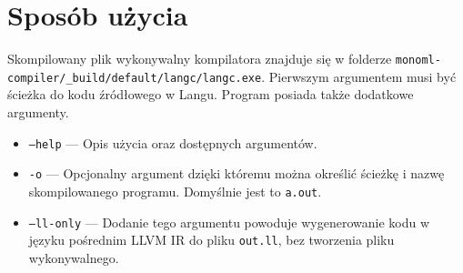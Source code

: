 \documentclass[declaration,shortabstract]{iithesis}
\begin{document}











\section{Sposób użycia}
Skompilowany plik wykonywalny kompilatora znajduje się w folderze \newline
\texttt{monoml-compiler/\_build/default/langc/langc.exe}. Pierwszym argumentem 
musi być ścieżka do kodu źródłowego w Langu. Program posiada także dodatkowe 
argumenty. 

\begin{itemize}
  \item \texttt{--help} --- Opis użycia oraz dostępnych argumentów. 
  \item \texttt{-o} --- Opcjonalny argument dzięki któremu można określić 
  ścieżkę i nazwę skompilowanego programu. Domyślnie jest to \texttt{a.out}.
  \item \texttt{--ll-only} --- Dodanie tego argumentu powoduje wygenerowanie 
  kodu w języku pośrednim LLVM IR do pliku \texttt{out.ll}, bez tworzenia pliku 
  wykonywalnego. 
\end{itemize}
\end{document}
